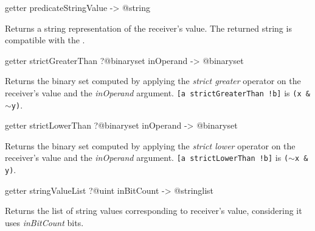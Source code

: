 
\begin{galgas3box}
getter predicateStringValue -> @string
\end{galgas3box}

Returns a string representation of the receiver's value. The returned string is compatible with the .








\begin{galgas3box}
getter strictGreaterThan ?@binaryset inOperand -> @binaryset
\end{galgas3box}

Returns the binary set computed by applying the \emph{strict greater} operator on the receiver's value and the \emph{inOperand} argument.
{\texttt{[a strictGreaterThan !b]} is \texttt{(x \& $\sim$y)}.}








\begin{galgas3box}
getter strictLowerThan ?@binaryset inOperand -> @binaryset
\end{galgas3box}

Returns the binary set computed by applying the \emph{strict lower} operator on the receiver's value and the \emph{inOperand} argument.
{\texttt{[a strictLowerThan !b]} is \texttt{($\sim$x \& y)}.}








\begin{galgas3box}
getter stringValueList ?@uint inBitCount -> @stringlist
\end{galgas3box}

Returns the list of string values corresponding to receiver's value, considering it uses \emph{inBitCount} bits.








